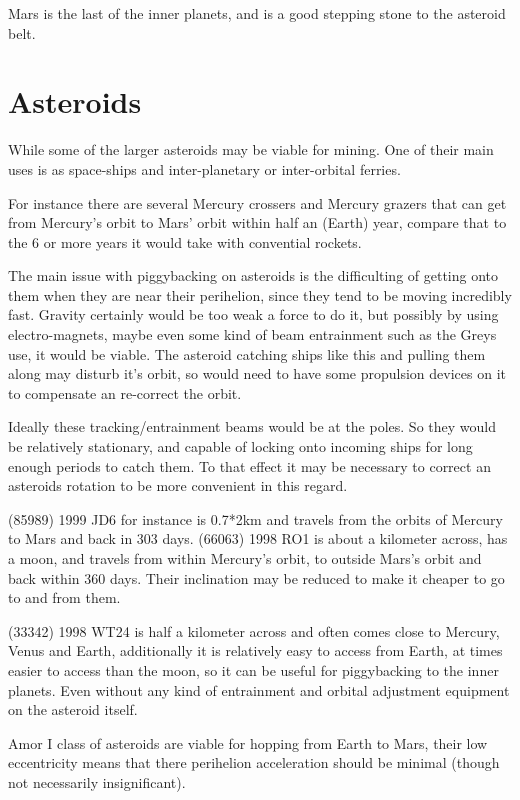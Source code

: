 Mars is the last of the inner planets, and is a good stepping stone to the
asteroid belt.

\section{Asteroids}
While some of the larger asteroids may be viable for mining. 
One of their main uses is as space-ships and inter-planetary 
or inter-orbital ferries. 

For instance there are several Mercury crossers and Mercury grazers that can 
get from Mercury's orbit to Mars' orbit within half an (Earth) year, 
compare that to the 6 or more years it would take with convential rockets. 

The main issue with piggybacking on asteroids is the difficulting of getting
onto them when they are near their perihelion, since they tend to be moving
incredibly fast.  Gravity certainly would be too weak a force to do it,  but
possibly by using electro-magnets, maybe even some kind of beam entrainment such
as the Greys use, it would be viable. The asteroid catching ships like this and
pulling them along may disturb it's orbit, so would need to have some propulsion
devices on it to compensate an re-correct the orbit.

Ideally these tracking/entrainment beams would be at the poles. So they would be
 relatively stationary, and capable of locking onto incoming ships for long enough periods
to catch them.  To that effect it may be necessary to correct an asteroids
rotation to be more convenient in this regard.

(85989) 1999 JD6 for instance is 0.7*2km and travels from the orbits of Mercury 
to Mars and back in 303 days. 
(66063) 1998 RO1 is about a kilometer across, has a moon, and travels from
within Mercury's orbit, to outside Mars's orbit and back within 360 days. 
Their inclination may be reduced to make it cheaper to go to and from
them. 

(33342) 1998 WT24 is half a kilometer across and often comes close to Mercury, 
Venus and Earth, additionally it is relatively easy to access from Earth, at 
times easier to access than the moon,  so it can be useful for piggybacking to 
the inner planets. Even without any kind of entrainment and orbital adjustment
equipment on the asteroid itself. 

Amor I class of asteroids are viable for hopping from Earth to Mars, their low
eccentricity means that there perihelion acceleration should be minimal (though
not necessarily insignificant).

